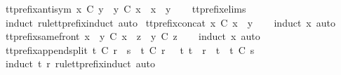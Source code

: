 \begin{isabellebody}
\isamarkupfalse%
\ tt{\isacharunderscore}prefix{\isacharunderscore}antisym{\isacharcolon}\ {\isachardoublequoteopen}x\ {\isasymle}\isactrlsub C\ y\ {\isasymLongrightarrow}\ y\ {\isasymle}\isactrlsub C\ x\ {\isasymLongrightarrow}\ x\ {\isacharequal}\ y{\isachardoublequoteclose}\isanewline
%
\isadelimproof
\ \ %
\endisadelimproof
%
\isatagproof
{}\isamarkupfalse%
\ tt{\isacharunderscore}prefix{\isachardot}elims{\isacharparenleft}{}{\isacharparenright}\ \isamarkupfalse%
\ {\isacharparenleft}induct\ rule{\isacharcolon}tt{\isacharunderscore}prefix{\isachardot}induct{\isacharcomma}\ auto{\isacharparenright}%
\endisatagproof
{\isafoldproof}%
%
\isadelimproof
\isanewline
%
\endisadelimproof
\isanewline
{}\isamarkupfalse%
\ tt{\isacharunderscore}prefix{\isacharunderscore}concat{\isacharcolon}\ {\isachardoublequoteopen}x\ {\isasymle}\isactrlsub C\ x\ {\isacharat}\ y{\isachardoublequoteclose}\isanewline
%
\isadelimproof
\ \ %
\endisadelimproof
%
\isatagproof
{}\isamarkupfalse%
\ {\isacharparenleft}induct\ x{\isacharcomma}\ auto{\isacharparenright}%
\endisatagproof
{\isafoldproof}%
%
\isadelimproof
\isanewline
%
\endisadelimproof
\isanewline
{}\isamarkupfalse%
\ tt{\isacharunderscore}prefix{\isacharunderscore}same{\isacharunderscore}front{\isacharcolon}\ {\isachardoublequoteopen}{\isacharparenleft}x\ {\isacharat}\ y\ {\isasymle}\isactrlsub C\ x\ {\isacharat}\ z{\isacharparenright}\ {\isacharequal}\ {\isacharparenleft}y\ {\isasymle}\isactrlsub C\ z{\isacharparenright}{\isachardoublequoteclose}\isanewline
%
\isadelimproof
\ \ %
\endisadelimproof
%
\isatagproof
{}\isamarkupfalse%
\ {\isacharparenleft}induct\ x{\isacharcomma}\ auto{\isacharparenright}%
\endisatagproof
{\isafoldproof}%
%
\isadelimproof
\isanewline
%
\endisadelimproof
\isanewline
{}\isamarkupfalse%
\ tt{\isacharunderscore}prefix{\isacharunderscore}append{\isacharunderscore}split{\isacharcolon}\ {\isachardoublequoteopen}t\ {\isasymle}\isactrlsub C\ r\ {\isacharat}\ s\ {\isasymLongrightarrow}\ t\ {\isasymle}\isactrlsub C\ r\ {\isasymor}\ {\isacharparenleft}{\isasymexists}\ t{\isacharprime}{\isachardot}\ t\ {\isacharequal}\ r\ {\isacharat}\ t{\isacharprime}\ {\isasymand}\ t{\isacharprime}\ {\isasymle}\isactrlsub C\ s{\isacharparenright}{\isachardoublequoteclose}\isanewline
%
\isadelimproof
\ \ %
\endisadelimproof
%
\isatagproof
{}\isamarkupfalse%
\ {\isacharparenleft}induct\ t\ r\ rule{\isacharcolon}tt{\isacharunderscore}prefix{\isachardot}induct{\isacharcomma}\ auto{\isacharparenright}%

\end{isabellebody}
